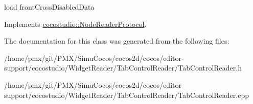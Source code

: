 load front\+Cross\+Disabled\+Data 

Implements \hyperlink{classcocostudio_1_1NodeReaderProtocol}{cocostudio\+::\+Node\+Reader\+Protocol}.



The documentation for this class was generated from the following files\+:\begin{DoxyCompactItemize}
\item 
/home/pmx/git/\+P\+M\+X/\+Simu\+Cocos/cocos2d/cocos/editor-\/support/cocostudio/\+Widget\+Reader/\+Tab\+Control\+Reader/Tab\+Control\+Reader.\+h\item 
/home/pmx/git/\+P\+M\+X/\+Simu\+Cocos/cocos2d/cocos/editor-\/support/cocostudio/\+Widget\+Reader/\+Tab\+Control\+Reader/Tab\+Control\+Reader.\+cpp\end{DoxyCompactItemize}
